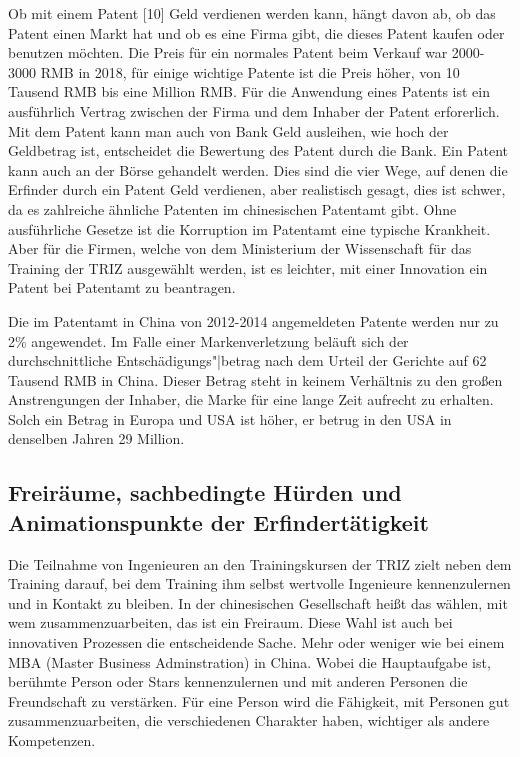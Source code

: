 \documentclass[11pt,a4paper]{article}
\begin{document}
Ob mit einem Patent [10] Geld verdienen werden kann, hängt davon ab, ob das
Patent einen Markt hat und ob es eine Firma gibt, die dieses Patent kaufen
oder benutzen möchten. Die Preis für ein normales Patent beim Verkauf war
2000-3000 RMB in 2018, für einige wichtige Patente ist die Preis höher, von 10
Tausend RMB bis eine Million RMB. Für die Anwendung eines Patents ist ein
ausführlich Vertrag zwischen der Firma und dem Inhaber der Patent erforerlich.
Mit dem Patent kann man auch von Bank Geld ausleihen, wie hoch der Geldbetrag
ist, entscheidet die Bewertung des Patent durch die Bank. Ein Patent kann auch
an der Börse gehandelt werden. Dies sind die vier Wege, auf denen die Erfinder
durch ein Patent Geld verdienen, aber realistisch gesagt, dies ist schwer, da
es zahlreiche ähnliche Patenten im chinesischen Patentamt gibt. Ohne
ausführliche Gesetze ist die Korruption im Patentamt eine typische Krankheit.
Aber für die Firmen, welche von dem Ministerium der Wissenschaft für das
Training der TRIZ ausgewählt werden, ist es leichter, mit einer Innovation ein
Patent bei Patentamt zu beantragen.

Die im Patentamt in China von 2012-2014 angemeldeten Patente werden nur zu 2\%
angewendet.  Im Falle einer Markenverletzung beläuft sich der
durchschnittliche Entschädigungs"|betrag nach dem Urteil der Gerichte auf 62
Tausend RMB in China. Dieser Betrag steht in keinem Verhältnis zu den großen
Anstrengungen der Inhaber, die Marke für eine lange Zeit aufrecht zu erhalten.
Solch ein Betrag in Europa und USA ist höher, er betrug in den USA in
denselben Jahren 29 Million.

\subsection{Freiräume, sachbedingte Hürden und Animationspunkte der
  Erfindertätigkeit} 

Die Teilnahme von Ingenieuren an den Trainingskursen der TRIZ zielt neben dem
Training darauf, bei dem Training ihm selbst wertvolle Ingenieure
kennenzulernen und in Kontakt zu bleiben. In der chinesischen Gesellschaft
heißt das wählen, mit wem zusammenzuarbeiten, das ist ein Freiraum. Diese Wahl
ist auch bei innovativen Prozessen die entscheidende Sache. Mehr oder weniger
wie bei einem MBA (Master Business Adminstration) in China. Wobei die
Hauptaufgabe ist, berühmte Person oder Stars kennenzulernen und mit anderen
Personen die Freundschaft zu verstärken. Für eine Person wird die Fähigkeit,
mit Personen gut zusammenzuarbeiten, die verschiedenen Charakter haben,
wichtiger als andere Kompetenzen.
\end{document}

